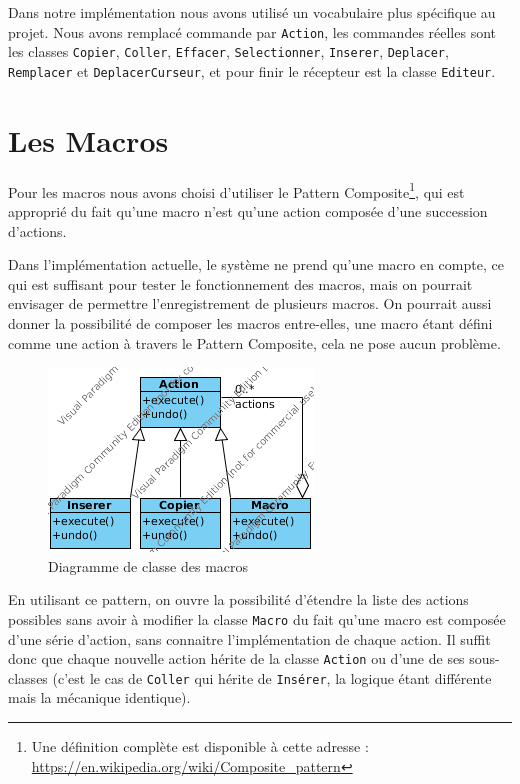 \documentclass[french]{article}
\begin{document}
Dans notre implémentation nous avons utilisé un vocabulaire plus spécifique au projet. Nous avons remplacé commande par \texttt{Action}, les commandes réelles sont les classes \texttt{Copier}, \texttt{Coller}, \texttt{Effacer}, \texttt{Selectionner}, \texttt{Inserer}, \texttt{Deplacer}, \texttt{Remplacer} et \texttt{DeplacerCurseur}, et pour finir le récepteur est la classe \texttt{Editeur}.

\section{Les Macros}\label{sec:macros}

Pour les macros nous avons choisi d'utiliser le Pattern Composite\footnote{Une définition complète est disponible à cette adresse : \url{https://en.wikipedia.org/wiki/Composite_pattern}}, qui est approprié du fait qu'une macro n'est qu'une action composée d'une succession d'actions.

Dans l'implémentation actuelle, le système ne prend qu'une macro en compte, ce qui est suffisant pour tester le fonctionnement des macros, mais on pourrait envisager de permettre l'enregistrement de plusieurs macros. On pourrait aussi donner la possibilité de composer les macros entre-elles, une macro étant défini comme une action à travers le Pattern Composite, cela ne pose aucun problème.

\begin{figure}[h!]
	\centering
	\includegraphics{composite-pattern.png}
	\caption{Diagramme de classe des macros}
\end{figure}


En utilisant ce pattern, on ouvre la possibilité d'étendre la liste des actions possibles sans avoir à modifier la classe \texttt{Macro} du fait qu'une macro est composée d'une série d'action, sans connaitre l'implémentation de chaque action. Il suffit donc que chaque nouvelle action hérite de la classe \texttt{Action} ou d'une de ses sous-classes (c'est le cas de \texttt{Coller} qui hérite de \texttt{Insérer}, la logique étant différente mais la mécanique identique). 
\end{document}

